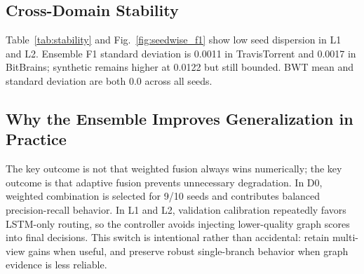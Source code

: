 \documentclass[journal]{IEEEtran}
\begin{document}
\begin{table}[H]
\caption{Domain-level delta analysis for ensemble F1.}
\label{tab:model_delta}
\centering
{}
\end{table}

\subsection{Cross-Domain Stability}
Table~\ref{tab:stability} and Fig.~\ref{fig:seedwise_f1} show low seed dispersion in L1 and L2. Ensemble F1 standard deviation is 0.0011 in TravisTorrent and 0.0017 in BitBrains; synthetic remains higher at 0.0122 but still bounded. BWT mean and standard deviation are both 0.0 across all seeds.

\begin{table}[H]
\caption{Seed stability and adaptive strategy behavior (10 seeds).}
\label{tab:stability}
\centering
{}
\end{table}

\subsection{Why the Ensemble Improves Generalization in Practice}
The key outcome is not that weighted fusion always wins numerically; the key outcome is that adaptive fusion prevents unnecessary degradation. In D0, weighted combination is selected for 9/10 seeds and contributes balanced precision-recall behavior. In L1 and L2, validation calibration repeatedly favors LSTM-only routing, so the controller avoids injecting lower-quality graph scores into final decisions. This switch is intentional rather than accidental: retain multi-view gains when useful, and preserve robust single-branch behavior when graph evidence is less reliable.
\end{document}
